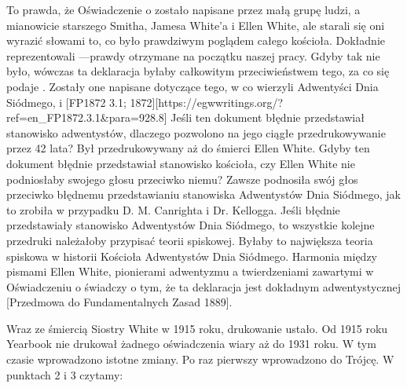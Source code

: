 To prawda, że Oświadczenie o  zostało napisane przez małą grupę ludzi, a mianowicie starszego Smitha, Jamesa White'a i Ellen White, ale starali się oni wyrazić słowami to, co było prawdziwym poglądem całego kościoła. Dokładnie reprezentowali —prawdy otrzymane na początku naszej pracy. Gdyby tak nie było, wówczas ta deklaracja byłaby całkowitym przeciwieństwem tego, za co się podaje . Zostały one napisane  dotyczące tego, w co wierzyli Adwentyści Dnia Siódmego,  i [FP1872 3.1; 1872][https://egwwritings.org/?ref=en\_FP1872.3.1&para=928.8] Jeśli ten dokument błędnie przedstawiał stanowisko adwentystów, dlaczego pozwolono na jego ciągłe przedrukowywanie przez 42 lata? Był przedrukowywany aż do śmierci Ellen White. Gdyby ten dokument błędnie przedstawiał stanowisko kościoła, czy Ellen White nie podniosłaby swojego głosu przeciwko niemu? Zawsze podnosiła swój głos przeciwko błędnemu przedstawianiu stanowiska Adwentystów Dnia Siódmego, jak to zrobiła w przypadku D. M. Canrighta i Dr. Kellogga. Jeśli  błędnie przedstawiały stanowisko Adwentystów Dnia Siódmego, to wszystkie kolejne przedruki należałoby przypisać teorii spiskowej. Byłaby to największa teoria spiskowa w historii Kościoła Adwentystów Dnia Siódmego. Harmonia między pismami Ellen White, pionierami adwentyzmu a twierdzeniami zawartymi w Oświadczeniu o  świadczy o tym, że ta deklaracja jest dokładnym  adwentystycznej [Przedmowa do Fundamentalnych Zasad 1889].

Wraz ze śmiercią Siostry White w 1915 roku, drukowanie  ustało. Od 1915 roku Yearbook nie drukował żadnego oświadczenia wiary aż do 1931 roku. W tym czasie  wprowadzono istotne zmiany. Po raz pierwszy wprowadzono do  Trójcę. W punktach 2 i 3 czytamy:


